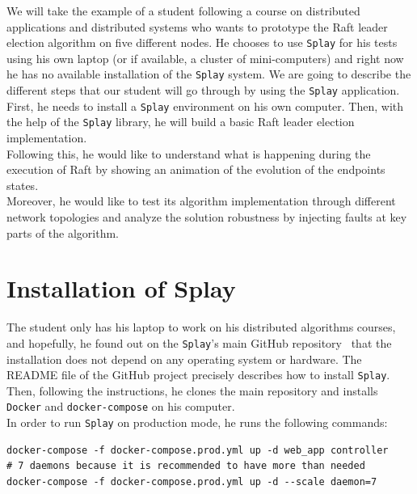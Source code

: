 \documentclass{eplmastersthesis}
\begin{document}
    We will take the example of a student following a course on distributed
    applications and distributed systems who wants to prototype the Raft
    leader election algorithm on five different nodes. He chooses to use
    \texttt{Splay} for his tests using his own laptop (or if available, a cluster
    of mini-computers) and right now he has no available installation of the
    \texttt{Splay} system. We are going to describe the different steps that our
    student will go through by using the \texttt{Splay} application.\\

    First, he needs to install a \texttt{Splay} environment on his own computer. Then,
    with the help of the \texttt{Splay} library, he will build a basic Raft leader
    election implementation.\\
    Following this, he would like to understand what is happening during the
    execution of Raft by showing an animation of the evolution of the
    endpoints states.\\
    Moreover, he would like to test its algorithm implementation through
    different network topologies and analyze the solution
    robustness by injecting faults at key parts of the algorithm.

    \section{Installation of Splay}

      The student only has his laptop to work on his distributed algorithms
      courses, and hopefully, he found out on the \texttt{Splay}'s main GitHub
      repository~\cite{SplayV2Git} that the installation does not depend on
      any operating system or hardware. The README file of the GitHub project
      precisely describes how to install \texttt{Splay}. Then, following the
      instructions, he clones the main repository and installs \texttt{Docker} and
      \texttt{docker-compose} on his computer.\\
      In order to run \texttt{Splay} on production mode, he runs the following
      commands: \\

      \begin{lstlisting}[style=MyBash]
docker-compose -f docker-compose.prod.yml up -d web_app controller
# 7 daemons because it is recommended to have more than needed
docker-compose -f docker-compose.prod.yml up -d --scale daemon=7
      \end{lstlisting}
\end{document}
